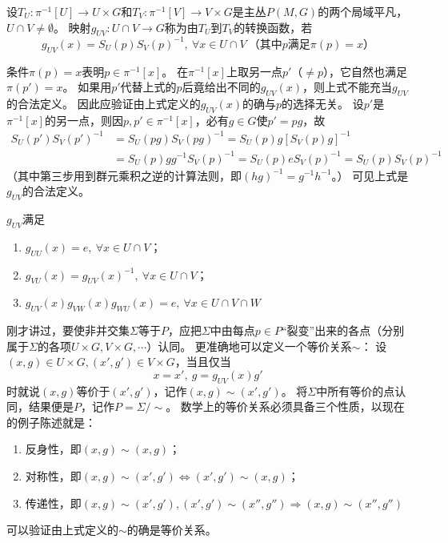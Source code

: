 \begin{definition}
    设$T_U \colon \pi^{-1}[U] \to U \times G$和$T_V \colon \pi^{-1}[V] \to V \times G$是主丛$P(M, G)$的两个局域平凡，$U \cap V \neq \emptyset$。
    映射$g_{UV} \colon U \cap V \to G$称为由$T_U$到$T_V$的转换函数，若
    $$g_{UV}(x) = S_U(p){S_V(p)}^{-1}, ~ \forall x \in U \cap V ~ \text{（其中$p$满足$\pi(p) = x$）}$$
\end{definition}

\begin{note}
    条件$\pi(p) = x$表明$p \in \pi^{-1}[x]$。
    在$\pi^{-1}[x]$上取另一点$p'$（$\neq p$），它自然也满足$\pi(p') = x$。
    如果用$p'$代替上式的$p$后竟给出不同的$g_{UV}(x)$，则上式不能充当$g_{UV}$的合法定义。
    因此应验证由上式定义的$g_{UV}(x)$的确与$p$的选择无关。
    设$p'$是$\pi^{-1}[x]$的另一点，则因$p, p' \in \pi^{-1}[x]$，必有$g \in G$使$p' = pg$，故
    \[\begin{split}
        S_U(p'){S_V(p')}^{-1} & = S_U(pg){S_V(pg)}^{-1} = S_U(p)g[S_V(p)g]^{-1} \\
        & = S_U(p)gg^{-1}{S_V(p)}^{-1} = S_U(p)e{S_V(p)}^{-1} = S_U(p){S_V(p)}^{-1}
    \end{split}\]
    （其中第三步用到群元乘积之逆的计算法则，即$(hg)^{-1} = g^{-1}h^{-1}$。）
    可见上式是$g_{UV}$的合法定义。
\end{note}

\begin{theorem}
    $g_{UV}$满足
    \begin{enumerate}[（a）]
        \item $g_{UU}(x) = e, ~ \forall x \in U \cap V$；
        \item $g_{VU}(x) = {g_{UV}(x)}^{-1}, ~ \forall x \in U \cap V$；
        \item $g_{UV}(x)g_{VW}(x)g_{WU}(x) = e, ~ \forall x \in U \cap V \cap W$
    \end{enumerate}
\end{theorem}

刚才讲过，要使非并交集$\Sigma$等于$P$，应把$\Sigma$中由每点$p \in P$``裂变''出来的各点（分别属于$\Sigma$的各项$U \times G, V \times G, \cdots$）认同。
更准确地可以定义一个等价关系$\sim$：
设$(x, g) \in U \times G, (x', g') \in V \times G$，当且仅当
$$x = x', ~ g = g_{UV}(x)g'$$
时就说$(x, g)$等价于$(x', g')$，记作$(x, g) \sim (x', g')$。
将$\Sigma$中所有等价的点认同，结果便是$P$，记作$P = \Sigma / \sim$。
数学上的等价关系必须具备三个性质，以现在的例子陈述就是：
\begin{enumerate}[（a）]
    \item 反身性，即$(x, g) \sim (x, g)$；
    \item 对称性，即$(x, g) \sim (x', g') \Leftrightarrow (x', g') \sim (x, g)$；
    \item 传递性，即$(x, g) \sim (x', g'), (x', g') \sim (x'', g'') \Rightarrow (x, g) \sim (x'', g'')$
\end{enumerate}
可以验证由上式定义的$\sim$的确是等价关系。

